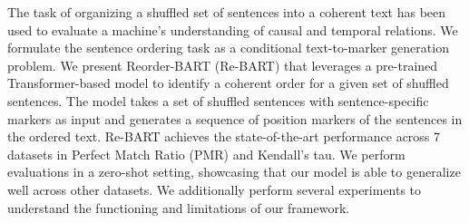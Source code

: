 The task of organizing a shuffled set of sentences into a coherent text has been used to evaluate a machine's understanding of causal and temporal relations. We formulate the sentence ordering task as a conditional text-to-marker generation problem. We present Reorder-BART (Re-BART) that leverages a pre-trained Transformer-based model to identify a coherent order for a given set of shuffled sentences. The model takes a set of shuffled sentences with sentence-specific markers as input and generates a sequence of position markers of the sentences in the ordered text. Re-BART achieves the state-of-the-art performance across 7 datasets in Perfect Match Ratio (PMR) and Kendall's tau. We perform evaluations in a zero-shot setting, showcasing that our model is able to generalize well across other datasets. We additionally perform several experiments to understand the functioning and limitations of our framework.

